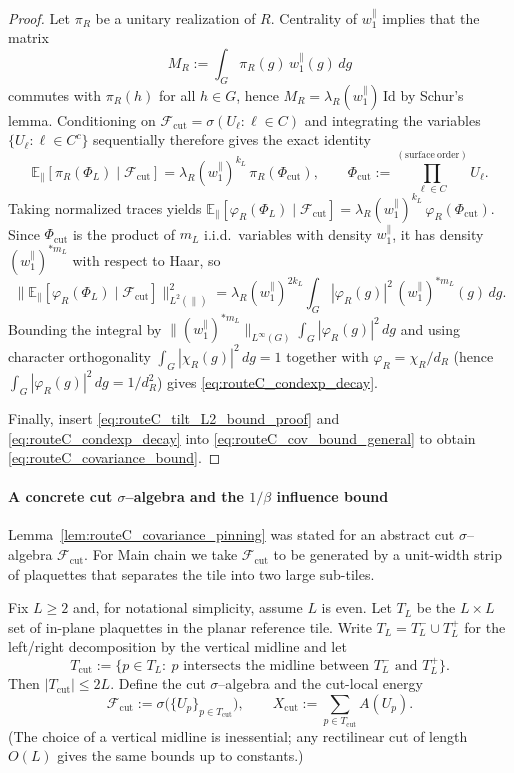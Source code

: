 \begin{proof}
Let $\pi_R$ be a unitary realization of $R$.
Centrality of $w_1^{\parallel}$ implies that the matrix
\[
M_R:=\int_G \pi_R(g)\, w_1^{\parallel}(g)\,dg
\]
commutes with $\pi_R(h)$ for all $h\in G$, hence $M_R=\lambda_R(w_1^{\parallel})\,\mathrm{Id}$ by Schur's lemma.
Conditioning on $\mathcal F_{\mathrm{cut}}=\sigma(U_\ell:\ell\in C)$ and integrating the variables
$\{U_\ell:\ell\in C^c\}$ sequentially therefore gives the exact identity
\[
\mathbb E_{\parallel}[\pi_R(\Phi_L)\mid\mathcal F_{\mathrm{cut}}]
=\lambda_R(w_1^{\parallel})^{k_L}\,\pi_R(\Phi_{\mathrm{cut}}),
\qquad
\Phi_{\mathrm{cut}}:=\prod_{\ell\in C}^{\!\!\mathrm{(surface\ order)}} U_\ell .
\]
Taking normalized traces yields
$\mathbb E_{\parallel}[\varphi_R(\Phi_L)\mid\mathcal F_{\mathrm{cut}}]
=\lambda_R(w_1^{\parallel})^{k_L}\,\varphi_R(\Phi_{\mathrm{cut}})$.
Since $\Phi_{\mathrm{cut}}$ is the product of $m_L$ i.i.d.\ variables with density $w_1^{\parallel}$, it has density
$(w_1^{\parallel})^{*m_L}$ with respect to Haar, so
\[
\Big\|\mathbb E_{\parallel}[\varphi_R(\Phi_L)\mid\mathcal F_{\mathrm{cut}}]\Big\|_{L^2(\parallel)}^2
= \lambda_R(w_1^{\parallel})^{2k_L}
\int_G |\varphi_R(g)|^2\,(w_1^{\parallel})^{*m_L}(g)\,dg.
\]
Bounding the integral by $\|(w_1^{\parallel})^{*m_L}\|_{L^\infty(G)}\int_G |\varphi_R(g)|^2\,dg$
and using character orthogonality $\int_G |\chi_R(g)|^2\,dg = 1$ together with $\varphi_R=\chi_R/d_R$ (hence $\int_G |\varphi_R(g)|^2\,dg = 1/d_R^2$)
gives \eqref{eq:routeC_condexp_decay}.

Finally, insert \eqref{eq:routeC_tilt_L2_bound_proof} and \eqref{eq:routeC_condexp_decay} into
\eqref{eq:routeC_cov_bound_general} to obtain \eqref{eq:routeC_covariance_bound}.
\end{proof}

\paragraph{A concrete cut $\sigma$--algebra and the $1/\beta$ influence bound}\label{sec:routeC_cut_instantiation}

Lemma~\ref{lem:routeC_covariance_pinning} was stated for an abstract cut $\sigma$--algebra $\mathcal F_{\mathrm{cut}}$.
For Main chain we take $\mathcal F_{\mathrm{cut}}$ to be generated by a unit-width strip of plaquettes that separates the tile into two large sub-tiles.

Fix $L\ge 2$ and, for notational simplicity, assume $L$ is even.
Let $T_L$ be the $L\times L$ set of in-plane plaquettes in the planar reference tile.
Write $T_L=T_L^{-}\cup T_L^{+}$ for the left/right decomposition by the vertical midline and let
\[
T_{\mathrm{cut}}
:=
\{p\in T_L:\ p\text{ intersects the midline between }T_L^{-}\text{ and }T_L^{+}\}.
\]
Then $|T_{\mathrm{cut}}|\le 2L$.
Define the cut $\sigma$--algebra and the cut-local energy
\begin{equation}\label{eq:routeC_cut_sigma_def}
\mathcal F_{\mathrm{cut}}:=\sigma\bigl(\{U_p\}_{p\in T_{\mathrm{cut}}}\bigr),
\qquad
X_{\mathrm{cut}}:=\sum_{p\in T_{\mathrm{cut}}} A(U_p).
\end{equation}
(The choice of a vertical midline is inessential; any rectilinear cut of length $O(L)$ gives the same bounds up to constants.)

